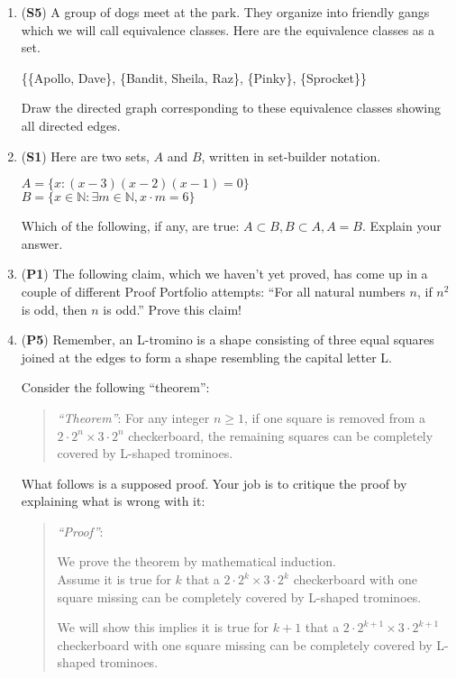 \documentclass[12pt]{article}
\begin{document}
\begin{enumerate}
\item (\textbf{S5}) A group of dogs meet at the park. They organize into friendly gangs which we will call equivalence classes. Here are the equivalence classes as a set. 

\{\{Apollo, Dave\}, \{Bandit, Sheila, Raz\}, \{Pinky\}, \{Sprocket\}\} 

Draw the directed graph corresponding to these equivalence classes showing all directed edges.


\item (\textbf{S1})
Here are two sets, $A$ and $B$, written in set-builder notation. 

$A=\{x: (x-3)(x-2)(x-1)=0\}$ \\
$B=\{x \in \mathbb{N}: \exists m \in \mathbb{N}, x\cdot m=6\}$

Which of the following, if any, are true: $A \subset B, B \subset A, A=B$. Explain your answer.


\item (\textbf{P1}) 
The following claim, which we haven't yet proved, has come up in a couple of different Proof Portfolio attempts: ``For all natural numbers $n$, if $n^2$ is odd, then $n$ is odd.'' Prove this claim!



\item (\textbf{P5})
Remember, an L-tromino is a shape consisting of three equal squares joined at the edges to form a shape resembling the capital letter L. 

Consider the following ``theorem'': 

\begin{verse}
\textit{``Theorem''}: For any integer $n \geq 1$, if one square is removed from a $2 \cdot 2^{n} \times 3 \cdot 2^{n}$ checkerboard, the remaining squares can be completely covered by L-shaped trominoes. 
\end{verse}

What follows is a supposed proof. Your job is to critique the proof by explaining what is wrong with it:

\begin{verse}
\textit{``Proof''}:

We prove the theorem by mathematical induction. \\ 
Assume it is true for $k$ that a $2 \cdot 2^{k} \times 3 \cdot 2^{k}$ checkerboard with one square missing can be completely covered by L-shaped trominoes. 

We will show this implies it is true for $k+1$ that a $2 \cdot 2^{k+1} \times 3 \cdot 2^{k+1}$ checkerboard with one square missing can be completely covered by L-shaped trominoes.


\end{verse}
\end{enumerate}
\end{document}
